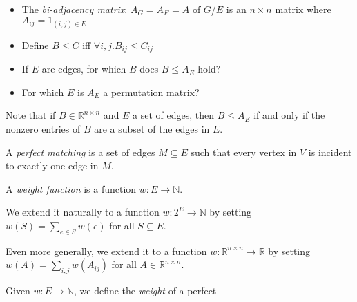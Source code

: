 \documentclass{beamer}
\newcommand{\nn}{\mathbb{N}}
\newcommand{\rr}{\mathbb{R}}
\begin{document}
\begin{frame}
  \begin{definitions}
    \begin{itemize}
      \item The \emph{bi-adjacency matrix}: $A_G = A_E = A$ of $G$/$E$ is an $n \times n$ matrix where
            $A_{ij} = 1_{(i, j) \in E}$
      \item Define $B \le C$ iff $\forall i, j. B_{ij} \le C_{ij}$
      \item If $E$ are edges, for which $B$ does $B \le A_E$ hold?
      \item For which $E$ is $A_E$ a permutation matrix?
    \end{itemize}
  \end{definitions}
\end{frame}
\begin{frame}
  \begin{definitions}
    Note that if $B \in \rr^{n \times n}$ and $E$ a set of edges,
    then $B \le A_E$ if and only if the nonzero entries of
    $B$ are a subset of the edges in $E$.

    A \emph{perfect matching} is a set of edges $M \subseteq E$ such
    that every vertex in $V$ is incident to exactly one edge in $M$.

    A \emph{weight function} is a function $w : E \to \nn$.

    We extend it naturally to a function $w : 2^E \to \nn$ by setting
    $w(S) = \sum_{e \in S} w(e)$ for all $S \subseteq E$.

    Even more generally, we extend it to a function $w : \rr^{n \times
        n} \to \rr$ by setting
    $w(A) = \sum_{i, j} w(A_{ij})$ for all $A \in \rr^{n \times n}$.

    Given $w : E \to \nn$, we define the \emph{weight} of a perfect
  \end{definitions}
\end{frame}
\end{document}
